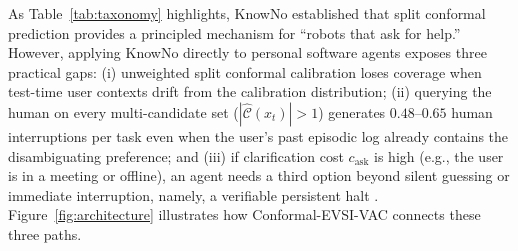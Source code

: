 \documentclass[11pt]{article}
\begin{document}
As Table~\ref{tab:taxonomy} highlights, KnowNo \citep{ren2023knowno} established that split conformal prediction provides a principled mechanism for ``robots that ask for help.'' However, applying KnowNo directly to personal software agents exposes three practical gaps: (i) unweighted split conformal calibration loses coverage when test-time user contexts drift from the calibration distribution; (ii) querying the human on every multi-candidate set ($|\hat{\mathcal{C}}(x_t)| > 1$) generates $0.48$--$0.65$ human interruptions per task even when the user's past episodic log already contains the disambiguating preference; and (iii) if clarification cost $c_{\mathrm{ask}}$ is high (e.g., the user is in a meeting or offline), an agent needs a third option beyond silent guessing or immediate interruption, namely, a verifiable persistent halt \citep{turner2020aup, elina2026maat}. Figure~\ref{fig:architecture} illustrates how Conformal-EVSI-VAC connects these three paths.
\end{document}
